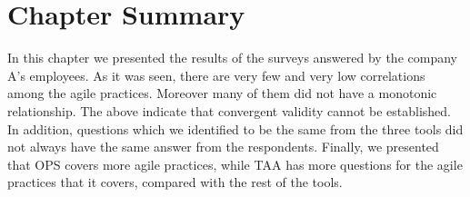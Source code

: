 

\section{Chapter Summary}
In this chapter we presented the results of the surveys answered by the company A's employees. As it was seen, there are very few and very low correlations among the agile practices. Moreover many of them did not have a monotonic relationship. The above indicate that convergent validity cannot be established. In addition, questions which we identified to be the same from the three tools did not always have the same answer from the respondents. Finally, we presented that \ac{OPS} covers more agile practices, while \ac{TAA} has more questions for the agile practices that it covers, compared with the rest of the tools.
